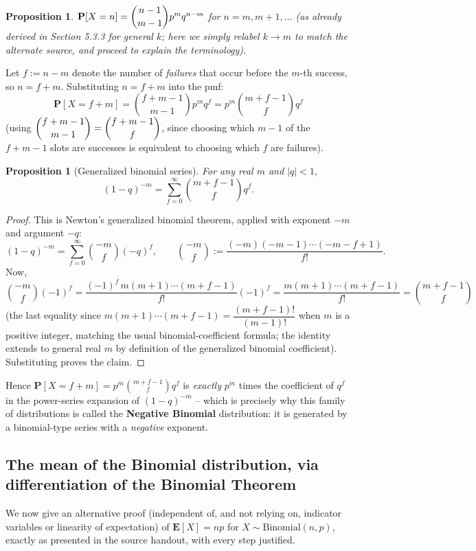 \documentclass[11pt]{article}
\theoremstyle{definition}
\theoremstyle{plain}
\newtheorem{proposition}[definition]{Proposition}
\theoremstyle{remark}
\newcommand{\E}[1]{\mathbf{E}\!\left[#1\right]}
\begin{document}
\begin{proposition}
$\mathbf{P}[X=n] = \dbinom{n-1}{m-1}p^m q^{n-m}$ for $n=m,m+1,\dots$ (as already derived in
Section 5.3.3 for general $k$; here we simply relabel $k\to m$ to match the alternate source, and
proceed to explain the terminology).
\end{proposition}

Let $f := n-m$ denote the number of \emph{failures} that occur before the $m$-th success, so
$n = f+m$. Substituting $n=f+m$ into the pmf:
\[
\mathbf{P}[X=f+m] = \binom{f+m-1}{m-1}p^m q^f = p^m\binom{m+f-1}{f}q^f
\]
(using $\dbinom{f+m-1}{m-1}=\dbinom{f+m-1}{f}$, since choosing which $m-1$ of the $f+m-1$ slots are
successes is equivalent to choosing which $f$ are failures).

\begin{proposition}[Generalized binomial series]
For any real $m$ and $|q|<1$,
\[
(1-q)^{-m} = \sum_{f=0}^\infty \binom{m+f-1}{f}q^f.
\]
\end{proposition}
\begin{proof}
This is Newton's generalized binomial theorem, applied with exponent $-m$ and argument $-q$:
\[
(1-q)^{-m} = \sum_{f=0}^\infty \binom{-m}{f}(-q)^f,
\qquad \binom{-m}{f} := \frac{(-m)(-m-1)\cdots(-m-f+1)}{f!}.
\]
Now,
\[
\binom{-m}{f}(-1)^f = \frac{(-1)^f\,m(m+1)\cdots(m+f-1)}{f!}(-1)^f
= \frac{m(m+1)\cdots(m+f-1)}{f!} = \binom{m+f-1}{f}
\]
(the last equality since $m(m+1)\cdots(m+f-1) = \dfrac{(m+f-1)!}{(m-1)!}$ when $m$ is a positive
integer, matching the usual binomial-coefficient formula; the identity extends to general real $m$
by definition of the generalized binomial coefficient). Substituting proves the claim.
\end{proof}

Hence $\mathbf{P}[X=f+m] = p^m\binom{m+f-1}{f}q^f$ is \emph{exactly} $p^m$ times the coefficient of
$q^f$ in the power-series expansion of $(1-q)^{-m}$ -- which is precisely why this family of
distributions is called the \textbf{Negative Binomial} distribution: it is generated by a
binomial-type series with a \emph{negative} exponent.

\subsection{The mean of the Binomial distribution, via differentiation of the Binomial Theorem}

We now give an alternative proof (independent of, and not relying on, indicator variables or
linearity of expectation) of $\E{X}=np$ for $X\sim\text{Binomial}(n,p)$, exactly as presented in
the source handout, with every step justified.
\end{document}
